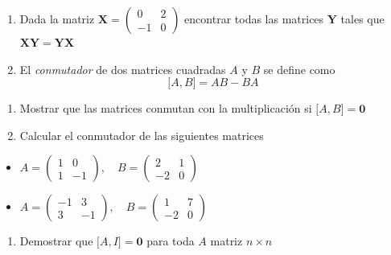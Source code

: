 \documentclass[
]{article}
\providecommand{\tightlist}{%
  \setlength{\itemsep}{0pt}\setlength{\parskip}{0pt}}
\begin{document}
\begin{enumerate}
\def\labelenumi{\arabic{enumi}.}
\setcounter{enumi}{4}
\item
  Dada la matriz
  \(\mathbf{X} =\begin{pmatrix} 0 & 2 \\ -1 & 0 \end{pmatrix}\)
  encontrar todas las matrices \(\mathbf{Y}\) tales que
  \(\mathbf{X}\mathbf{Y} = \mathbf{Y}\mathbf{X}\)
\item
  El \emph{conmutador} de dos matrices cuadradas \(A\) y \(B\) se define
  como \[
  \big[A,B\big] = AB - BA
  \]
\end{enumerate}

\begin{enumerate}
\def\labelenumi{\alph{enumi})}
\item
  Mostrar que las matrices conmutan con la multiplicación si
  \(\big[A,B\big] = \mathbf{0}\)
\item
  Calcular el conmutador de las siguientes matrices
\end{enumerate}

\begin{itemize}
\item
  \(A=\begin{pmatrix} 1 & 0 \\1 & -1\end{pmatrix},\quad B=\begin{pmatrix} 2 & 1 \\-2 & 0\end{pmatrix}\)
\item
  \(A=\begin{pmatrix} -1 & 3 \\ 3 & -1\end{pmatrix},\quad B=\begin{pmatrix} 1 & 7 \\-2 & 0\end{pmatrix}\)
\end{itemize}

\begin{enumerate}
\def\labelenumi{\alph{enumi})}
\setcounter{enumi}{2}
\tightlist
\item
  Demostrar que \(\big[A,I\big] = \mathbf{0}\) para toda \(A\) matriz
  \(n\times n\)
\end{enumerate}
\end{document}
